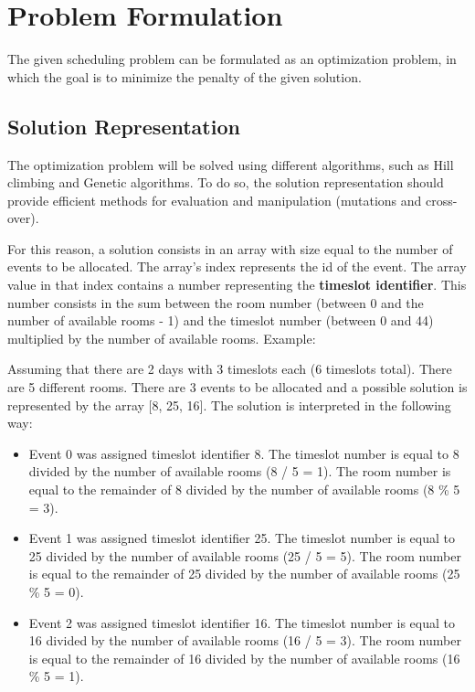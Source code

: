 \documentclass[conference]{IEEEtran}
\begin{document}
\section{Problem Formulation}

The given scheduling problem can be formulated as an optimization problem, in which the goal is to minimize the penalty of the given solution.

\subsection{Solution Representation}

The optimization problem will be solved using different algorithms, such as Hill climbing and Genetic algorithms. To do so, the solution representation should provide efficient methods for evaluation and manipulation (mutations and cross-over).

For this reason, a solution consists in an array with size equal to the number of events to be allocated. The array's index represents the id of the event. The array value in that index contains a number representing the \textbf{timeslot identifier}. This number consists in the sum between the room number (between 0 and the number of available rooms - 1) and the timeslot number (between 0 and 44) multiplied by the number of available rooms. Example:

Assuming that there are 2 days with 3 timeslots each (6 timeslots total). There are 5 different rooms. There are 3 events to be allocated and a possible solution is represented by the array [8, 25, 16]. The solution is interpreted in the following way:

\begin{itemize}
    \item Event 0 was assigned timeslot identifier 8. The timeslot number is equal to 8 divided by the number of available rooms (8 / 5 = 1). The room number is equal to the remainder of 8 divided by the number of available rooms (8 \% 5 = 3).
    \item Event 1 was assigned timeslot identifier 25. The timeslot number is equal to 25 divided by the number of available rooms (25 / 5 = 5). The room number is equal to the remainder of 25 divided by the number of available rooms (25 \% 5 = 0).
    \item Event 2 was assigned timeslot identifier 16. The timeslot number is equal to 16 divided by the number of available rooms (16 / 5 = 3). The room number is equal to the remainder of 16 divided by the number of available rooms (16 \% 5 = 1).
\end{itemize}
\end{document}
